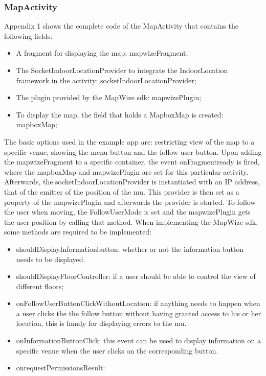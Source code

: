 \subsubsection{MapActivity}
Appendix 1 shows the complete code of the MapActivity that contains the following fields:
\begin{itemize}
\item A fragment for displaying the map: mapwizeFragment;
\item The SocketIndoorLocationProvider to integrate the IndoorLocation framework in the activity: socketIndoorLocationProvider;
\item The plugin provided by the MapWize \acrshort{sdk}: mapwizePlugin;
\item To display the map, the field that holds a MapboxMap is created: mapboxMap;
\end{itemize}
The basic options used in the example \acrshort{app} are: restricting view of the map to a specific venue, showing the menu button and the follow user button. Upon adding the mapwizeFragment to a specific container, the event onFragmentready is fired, where the mapboxMap and mapwizePlugin are set for this particular activity. Afterwards, the socketIndoorLocationProvider is instantiated with an IP address, that of the emitter of the position of the \acrlong{mu}. This provider is then set as a property of the mapwizePlugin and afterwards the provider is started. To follow the user when moving, the FollowUserMode is set and the mapwizePlugin gets the user position by calling that method. When implementing the MapWize \acrshort{sdk}, some methods are required to be implemented:
\begin{itemize}
\item shouldDisplayInformationbutton: whether or not the information button needs to be displayed.
\item shouldDisplayFloorController: if a user should be able to control the view of different floors;
\item onFollowUserButtonClickWithoutLocation: if anything needs to happen when a user clicks the the follow button without having granted access to his or her location, this is handy for displaying errors to the \acrshort{mu}.
\item onInformationButtonClick: this event can be used to display information on a specific venue when the user clicks on the corresponding button.
\item onrequestPermissionsResult:
\end{itemize}
